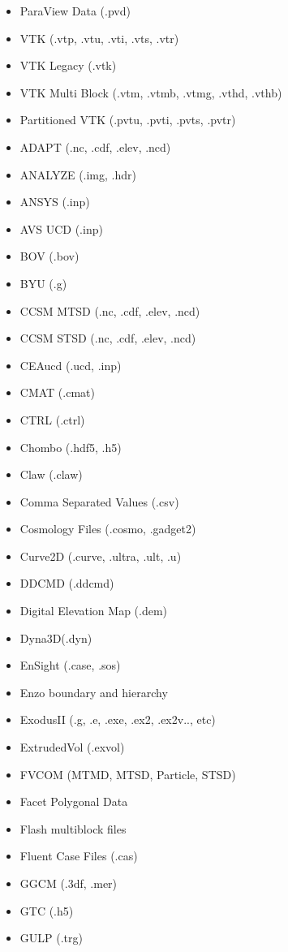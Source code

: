   \begin{itemize}
  \setlength{\itemsep}{0pt}
  \setlength{\parskip}{0pt}
  \item ParaView Data (.pvd)
  \item VTK (.vtp, .vtu, .vti, .vts, .vtr)
  \item VTK Legacy (.vtk)
  \item VTK Multi Block (.vtm, .vtmb, .vtmg, .vthd, .vthb)
  \item Partitioned VTK (.pvtu, .pvti, .pvts, .pvtr)
  \item ADAPT (.nc, .cdf, .elev, .ncd)
  \item ANALYZE (.img, .hdr)
  \item ANSYS (.inp)
  \item AVS UCD (.inp)
  \item BOV (.bov)
  \item BYU (.g)
  \item CCSM MTSD (.nc, .cdf, .elev, .ncd)
  \item CCSM STSD (.nc, .cdf, .elev, .ncd)
  \item CEAucd (.ucd, .inp)
  \item CMAT (.cmat)
  \item CTRL (.ctrl)
  \item Chombo (.hdf5, .h5)
  \item Claw (.claw)
  \item Comma Separated Values (.csv)
  \item Cosmology Files (.cosmo, .gadget2)
  \item Curve2D (.curve, .ultra, .ult, .u)
  \item DDCMD (.ddcmd)
  \item Digital Elevation Map (.dem)
  \item Dyna3D(.dyn)
  \item EnSight (.case, .sos)
  \item Enzo boundary and hierarchy
  \item ExodusII (.g, .e, .exe, .ex2, .ex2v.., etc)
  \item ExtrudedVol (.exvol)
  \item FVCOM (MTMD, MTSD, Particle, STSD) 
  \item Facet Polygonal Data
  \item Flash multiblock files
  \item Fluent Case Files (.cas)
  \item GGCM (.3df, .mer)
  \item GTC (.h5)
  \item GULP (.trg)

\end{itemize}
